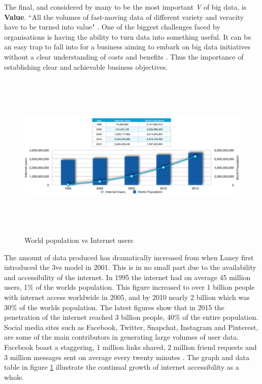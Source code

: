 The final, and considered by many to be the most important \textit{V} of big data, is \textbf{Value}. ``All the volumes of fast-moving data of different variety and veracity have to be turned into value" \cite{ibm}. One of the biggest challenges faced by organisations is having the ability to turn data into something useful. It can be an easy trap to fall into for a business aiming to embark on big data initiatives without a clear understanding of costs and benefits \cite{bigdata}. Thus the importance of establishing clear and achievable business objectives.

\begin{figure}[h]\begin{center}\includegraphics[height = 8cm,width=1\linewidth]{images/worldpopgraph}\caption{World population vs Internet users}\label{fig:worldpop}\end{center}\end{figure}
The amount of data produced has dramatically increased from when Laney first introduced the 3vs model in 2001. This is in no small part due to the availability and accessibility of the internet. In 1995 the internet had on average 45 million users, 1\% of the worlds population. This figure increased to over 1 billion people with internet access worldwide in 2005, and by 2010 nearly 2 billion which was 30\% of the worlds population. The latest figures show that in 2015 the penetration of the internet reached 3 billion people, 40\% of the entire population. Social media sites such as Facebook, Twitter, Snapchat, Instagram and Pinterest, are some of the main contributors in generating large volumes of user data. Facebook boast a staggering, 1 million links shared, 2 million friend requests and 3 million messages sent on average every twenty minutes \cite{statref}. The graph and data table in figure \ref{fig:worldpop} illustrate the continual growth of internet accessibility as a whole.